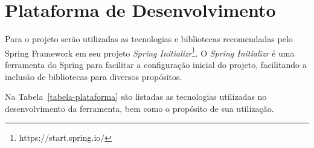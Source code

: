\chapter{Plataforma de Desenvolvimento}
\label{sec-plataforma}
\vspace{-1cm}
Para o projeto serão utilizadas as tecnologias e bibliotecas recomendadas pelo Spring Framework em seu projeto \textit{Spring Initializr}\footnote{https://start.spring.io/}. O \textit{Spring Initializr} é uma ferramenta do Spring para facilitar a configuração inicial do projeto, facilitando a inclusão de bibliotecas para diversos propósitos.



Na Tabela~\ref{tabela-plataforma} são listadas as tecnologias utilizadas no desenvolvimento da ferramenta, bem como o propósito de sua utilização.

